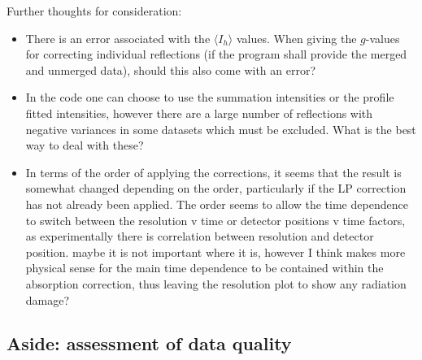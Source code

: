 \documentclass[11pt, oneside]{article}   	%
\begin{document}
Further thoughts for consideration:
\begin{itemize}
\item{There is an error associated with the $\langle I_h \rangle$ values. When giving the $g$-values for correcting individual reflections (if the program shall provide the merged and unmerged data), should this also come with an error?}
\item{In the code one can choose to use the summation intensities or the profile fitted intensities, however there are a large number of reflections with negative variances in some datasets which must be excluded. What is the best way to deal with these?}
\item{In terms of the order of applying the corrections, it seems that the result is somewhat changed depending on the order, particularly if the LP correction has not already been applied. The order seems to allow the time dependence to switch between the resolution v time or detector positions v time factors, as experimentally there is correlation between resolution and detector position. maybe it is not important where it is, however I think makes more physical sense for the main time dependence to be contained within the absorption correction, thus leaving the resolution plot to show any radiation damage?}
\end{itemize}





\subsection{Aside: assessment of data quality}
\end{document}
